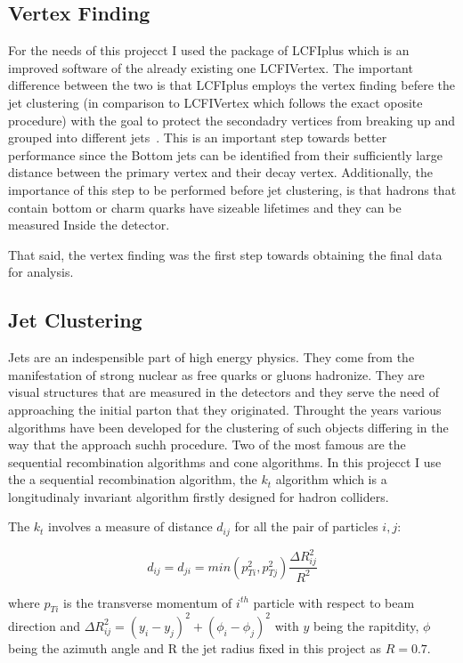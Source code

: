\documentclass[12pt,a4paper]{report}
\begin{document}
\subsection{Vertex Finding}

For the needs of this projecct I used the package of LCFIplus which is an improved software of the already 
existing one LCFIVertex. The important difference between the  two is that LCFIplus employs the vertex finding 
befere the jet clustering (in comparison to LCFIVertex which follows the exact oposite procedure) with the 
goal to protect the secondadry vertices from breaking up and grouped into different jets~\cite{suehara2016lcfiplus}.
This is an important step towards better performance since the Bottom jets can be identified from their 
sufficiently large distance between the primary vertex and their decay vertex. Additionally, the importance
of this step to be performed before jet clustering, is that hadrons that contain bottom or charm quarks 
have sizeable lifetimes and they can be measured Inside the detector.


That said, the vertex finding was the first step towards obtaining the final data for analysis.

\subsection{Jet Clustering}

Jets are an indespensible part of high energy physics. They come from the manifestation of strong nuclear
as free quarks or gluons hadronize. They are visual structures that are measured in the detectors and they
serve the need of approaching the initial parton that they originated. Throught the years various algorithms 
have been developed for the clustering of such objects differing in the way that the approach suchh procedure.
Two of the most famous are the sequential recombination algorithms and cone algorithms. In this projecct I use
the a sequential recombination algorithm, the $k_{t}$ algorithm which is a longitudinaly invariant algorithm
firstly designed for hadron colliders.

The $k_{t}$ involves a measure of distance $d_{ij}$ for all the pair of particles $i,j$:

\begin{equation}
 d_{ij}=d_{ji}=min(p_{Ti}^{2},p_{Tj}^{2})\frac{\Delta R^{2}_{ij}}{R^{2}}
\end{equation}


where $p_{Ti}$ is the transverse momentum of $i^{th}$ particle with respect to beam direction and 
$\Delta R^{2}_{ij}=(y_{i}-y_{j})^{2}+(\phi_{i}-\phi_{j})^{2}$ with $y$ being the rapitdity, $\phi$ being
the azimuth angle and R the jet radius fixed in this project as $R=0.7$.
\end{document}

